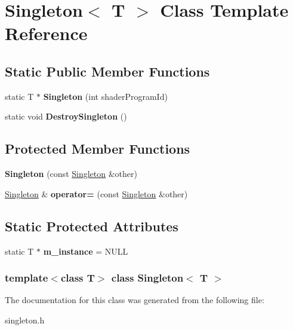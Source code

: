 \hypertarget{classSingleton}{
\section{Singleton$<$ T $>$ Class Template Reference}
\label{classSingleton}
}
\subsection*{Static Public Member Functions}
\begin{DoxyCompactItemize}
\item 
\hypertarget{classSingleton_a57cb3b89f16fc5926bebf3b07b627b03}{
static T $\ast$ {\bfseries Singleton} (int shaderProgramId)}
\label{classSingleton_a57cb3b89f16fc5926bebf3b07b627b03}

\item 
\hypertarget{classSingleton_a1d1165bbf5ba233fe8fa7198685fce43}{
static void {\bfseries DestroySingleton} ()}
\label{classSingleton_a1d1165bbf5ba233fe8fa7198685fce43}

\end{DoxyCompactItemize}
\subsection*{Protected Member Functions}
\begin{DoxyCompactItemize}
\item 
\hypertarget{classSingleton_a52d4e99fde1c7240d0a622ec7ddcda04}{
{\bfseries Singleton} (const \hyperlink{classSingleton}{Singleton} \&other)}
\label{classSingleton_a52d4e99fde1c7240d0a622ec7ddcda04}

\item 
\hypertarget{classSingleton_a0d67df9f1bce51f33c48eab587a91890}{
\hyperlink{classSingleton}{Singleton} \& {\bfseries operator=} (const \hyperlink{classSingleton}{Singleton} \&other)}
\label{classSingleton_a0d67df9f1bce51f33c48eab587a91890}

\end{DoxyCompactItemize}
\subsection*{Static Protected Attributes}
\begin{DoxyCompactItemize}
\item 
\hypertarget{classSingleton_a77987e85742da3505825c3195ed7c8a6}{
static T $\ast$ {\bfseries m\_\-instance} = NULL}
\label{classSingleton_a77987e85742da3505825c3195ed7c8a6}

\end{DoxyCompactItemize}
\subsubsection*{template$<$class T$>$ class Singleton$<$ T $>$}



The documentation for this class was generated from the following file:\begin{DoxyCompactItemize}
\item 
singleton.h\end{DoxyCompactItemize}
